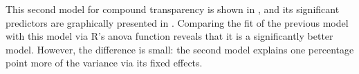 








This second model for compound transparency is shown in 
, and its significant
predictors are graphically presented in 
. Comparing the
fit of the previous model with this model via R's anova function
reveals that it is a significantly better model. However, the
difference is small: the second model explains one percentage point more
of the variance via its fixed effects. 

